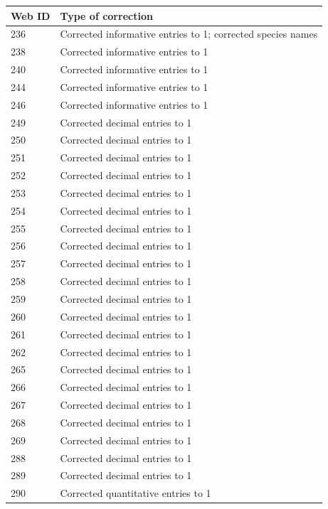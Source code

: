 \documentclass[12pt]{article}
\begin{document}
\begin{center}
      \begin{table}
      {\footnotesize
      \begin{tabular}{l | p{13cm}}
      Web ID & Type of correction \\
      \hline
      236 &  Corrected informative entries to 1; corrected species names \\
      238 &  Corrected informative entries to 1 \\
      240 &  Corrected informative entries to 1 \\
      244 &  Corrected informative entries to 1 \\
      246 &  Corrected informative entries to 1 \\
      249 &  Corrected decimal entries to 1 \\
      250 &  Corrected decimal entries to 1 \\
      251 &  Corrected decimal entries to 1 \\
      252 &  Corrected decimal entries to 1 \\
      253 &  Corrected decimal entries to 1 \\
      254 &  Corrected decimal entries to 1 \\
      255 &  Corrected decimal entries to 1 \\
      256 &  Corrected decimal entries to 1 \\
      257 &  Corrected decimal entries to 1 \\
      258 &  Corrected decimal entries to 1 \\
      259 &  Corrected decimal entries to 1 \\
      260 &  Corrected decimal entries to 1 \\
      261 &  Corrected decimal entries to 1 \\
      262 &  Corrected decimal entries to 1 \\
      265 &  Corrected decimal entries to 1 \\
      266 &  Corrected decimal entries to 1 \\
      267 &  Corrected decimal entries to 1 \\
      268 &  Corrected decimal entries to 1 \\
      269 &  Corrected decimal entries to 1 \\
      288 &  Corrected decimal entries to 1 \\
      289 &  Corrected decimal entries to 1 \\
      290 &  Corrected quantitative entries to 1 \\

\end{tabular}}
\end{table}
\end{center}
\end{document}

